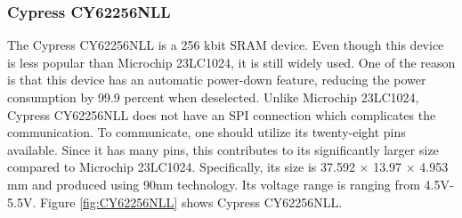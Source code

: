 %
%

\subsubsection{Cypress CY62256NLL}
The Cypress CY62256NLL is a 256 kbit SRAM device. Even though this device is less popular than Microchip 23LC1024, it is still widely used. One of the reason is that this device has an automatic power-down feature, reducing the power consumption by 99.9 percent when deselected. Unlike Microchip 23LC1024, Cypress CY62256NLL does not have an SPI connection which complicates the communication. To communicate, one should utilize its twenty-eight pins available. Since it has many pins, this contributes to its significantly larger size compared to Microchip 23LC1024. Specifically, its size is 37.592 × 13.97 × 4.953 mm and produced using 90nm technology. Its voltage range is ranging from 4.5V-5.5V. Figure \ref{fig:CY62256NLL} shows Cypress CY62256NLL.

